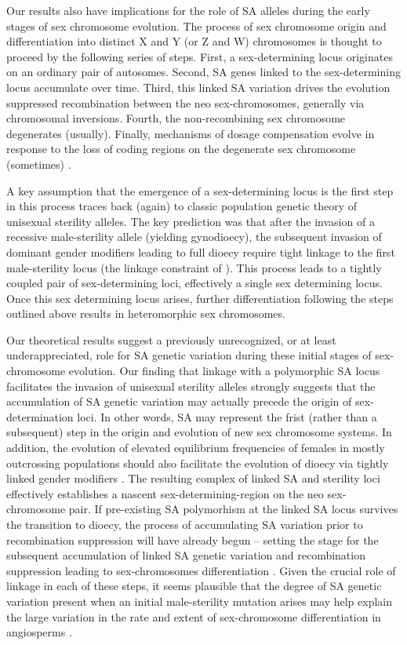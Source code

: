 \documentclass[9pt,twocolumn,twoside,lineno]{gsajnl}
\begin{document}
Our results also have implications for the role of SA alleles during the early stages of sex chromosome evolution. The process of sex chromosome origin and differentiation into distinct X and Y (or Z and W) chromosomes is thought to proceed by the following series of steps. First, a sex-determining locus originates on an ordinary pair of autosomes. Second, SA genes linked to the sex-determining locus accumulate over time. Third, this linked SA variation drives the evolution suppressed recombination between the neo sex-chromosomes, generally via chromosomal inversions. Fourth, the non-recombining sex chromosome degenerates (usually). Finally, mechanisms of dosage compensation evolve in response to the loss of coding regions on the degenerate sex chromosome (sometimes) \citep{Rice1987,Charlesworth2002,Bachtrog2006,Qiuetal2013,Bachtrog2014}. 

A key assumption that the emergence of a sex-determining locus is the first step in this process traces back (again) to classic population genetic theory of unisexual sterility alleles. The key prediction was that after the invasion of a recessive male-sterility allele (yielding gynodioecy), the subsequent invasion of dominant gender modifiers leading to full dioecy require tight linkage to the first male-sterility locus (the linkage constraint of \citealt{Charlesworth1978a}). This process leads to a tightly coupled pair of sex-determining loci, effectively a single sex determining locus. Once this sex determining locus arises, further differentiation following the steps outlined above results in heteromorphic sex chromosomes.

Our theoretical results suggest a previously unrecognized, or at least underappreciated, role for SA genetic variation during these initial stages of sex-chromosome evolution. Our finding that linkage with a polymorphic SA locus facilitates the invasion of unisexual sterility alleles strongly suggests that the accumulation of SA genetic variation may actually precede the origin of sex-determination loci. In other words, SA may represent the frist (rather than a subsequent) step in the origin and evolution of new sex chromosome systems. In addition, the evolution of elevated equilibrium frequencies of females in mostly outcrossing populations should also facilitate the evolution of dioecy via tightly linked gender modifiers \citep{Charlesworth1978a}. The resulting complex of linked SA and sterility loci effectively establishes a nascent sex-determining-region on the neo sex-chromosome pair. If pre-existing SA polymorhism at the linked SA locus survives the transition to dioecy, the process of accumulating SA variation prior to recombination suppression will have already begun -- setting the stage for the subsequent accumulation of linked SA genetic variation and recombination suppression leading to sex-chromosomes differentiation \citep{Charlesworth1978a,Rice1987,Bachtrog2006,Qiuetal2013}. Given the crucial role of linkage in each of these steps, it seems plausible that the degree of SA genetic variation present when an initial male-sterility mutation arises may help explain the large variation in the rate and extent of sex-chromosome differentiation in angiosperms \citep{Charlesworth2002,Renner2014,Bachtrog2014}.



\end{document}
